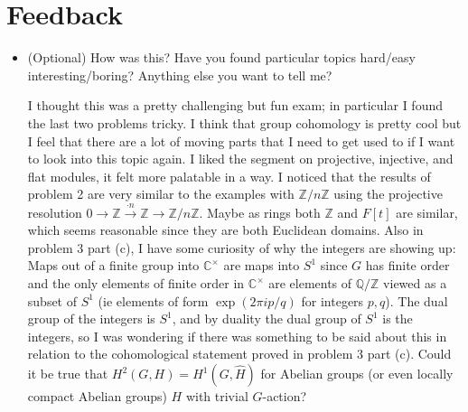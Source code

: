 \documentclass[11pt]{article}
\begin{document}
\section{Feedback}
\begin{itemize}
    \item (Optional) How was this? Have you found particular topics hard/easy interesting/boring?
    Anything else you want to tell me? 

    I thought this was a pretty challenging but fun exam; in particular I found the last two problems tricky. I think that group cohomology is pretty cool but I feel that there are a lot of moving parts that I need to get used to if I want to look into this topic again. I liked the segment on projective, injective, and flat modules, it felt more palatable in a way. I noticed that the results of problem 2 are very similar to the examples with $\mathbb{Z}/n\mathbb{Z}$ using the projective resolution $0\to \mathbb{Z}\xrightarrow{\cdot n}\mathbb{Z}\to \mathbb{Z}/n\mathbb{Z}$. Maybe as rings both $\mathbb{Z}$ and $F[t]$ are similar, which seems reasonable since they are both Euclidean domains. Also in problem 3 part (c), I have some curiosity of why the integers are showing up: Maps out of a finite group into $\mathbb{C}^\times$ are maps into $S^1$ since $G$ has finite order and the only elements of finite order in $\mathbb{C}^\times$ are elements of $\mathbb{Q}/\mathbb{Z}$ viewed as a subset of $S^1$ (ie elements of form $\exp(2\pi i p/q)$ for integers $p,q$). The dual group of the integers is $S^1$, and by duality the dual group of $S^1$ is the integers, so I was wondering if there was something to be said about this in relation to the cohomological statement proved in problem 3 part (c). Could it be true that $H^2(G,H) = H^1(G,\hat H)$ for Abelian groups (or even locally compact Abelian groups) $H$ with trivial $G$-action?
\end{itemize}
\end{document}
